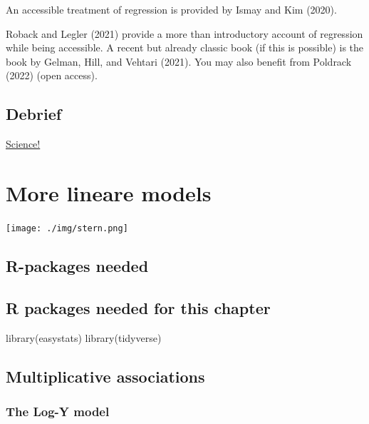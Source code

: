 \documentclass[
  letterpaper,
  DIV=11,
  numbers=noendperiod]{scrreprt}
\newenvironment{Shaded}{\begin{snugshade}}{\end{snugshade}}
\newcommand{\FunctionTok}[1]{\textcolor[rgb]{0.28,0.35,0.67}{#1}}
\newcommand{\NormalTok}[1]{\textcolor[rgb]{0.00,0.23,0.31}{#1}}
\theoremstyle{definition}
\theoremstyle{definition}
\theoremstyle{remark}
\begin{document}
An accessible treatment of regression is provided by Ismay and Kim
(2020).

Roback and Legler (2021) provide a more than introductory account of
regression while being accessible. A recent but already classic book (if
this is possible) is the book by Gelman, Hill, and Vehtari (2021). You
may also benefit from Poldrack (2022) (open access).

\hypertarget{debrief}{%
\section{Debrief}\label{debrief}}

\href{https://media.giphy.com/media/141amBdjqs9Vvy/giphy.gif}{Science!}


\hypertarget{more-lineare-models}{%
\chapter{More lineare models}\label{more-lineare-models}}

\texttt{[image: ./img/stern.png]}

\hypertarget{r-packages-needed}{%
\section{R-packages needed}\label{r-packages-needed}}

\hypertarget{r-packages-needed-for-this-chapter-2}{%
\section{R packages needed for this
chapter}\label{r-packages-needed-for-this-chapter-2}}

\begin{Shaded}
\begin{Highlighting}[]
\FunctionTok{library}\NormalTok{(easystats)}
\FunctionTok{library}\NormalTok{(tidyverse)}
\end{Highlighting}
\end{Shaded}

\hypertarget{multiplicative-associations}{%
\section{Multiplicative
associations}\label{multiplicative-associations}}

\hypertarget{the-log-y-model}{%
\subsection{The Log-Y model}\label{the-log-y-model}}
\end{document}
